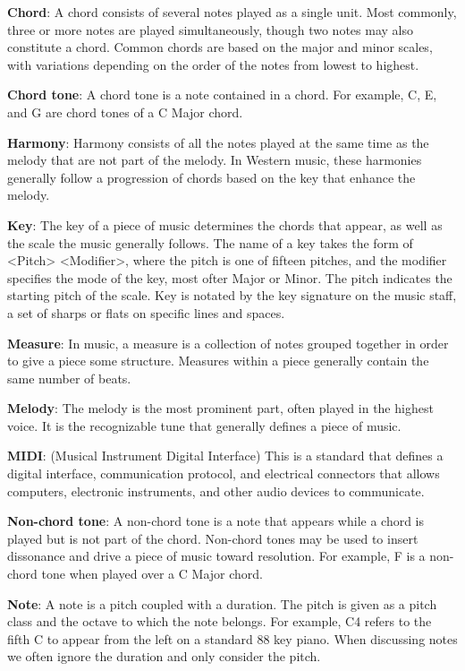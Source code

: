 \textbf{Chord}: A chord consists of several notes played as a single unit.
Most commonly, three or more notes are played simultaneously, though two notes may also constitute a chord.
Common chords are based on the major and minor scales, with variations depending on the order of the notes from lowest to highest.

\textbf{Chord tone}: A chord tone is a note contained in a chord.
For example, C, E, and G are chord tones of a C Major chord.

\textbf{Harmony}: Harmony consists of all the notes played at the same time as the melody that are not part of the melody.
In Western music, these harmonies generally follow a progression of chords based on the key that enhance the melody.

\textbf{Key}: The key of a piece of music determines the chords that appear, as well as the scale the music generally follows.
The name of a key takes the form of <Pitch> <Modifier>, where the pitch is one of fifteen pitches, and the modifier specifies the mode of the key, most ofter Major or Minor.
The pitch indicates the starting pitch of the scale.
Key is notated by the key signature on the music staff, a set of sharps or flats on specific lines and spaces.

\textbf{Measure}: In music, a measure is a collection of notes grouped together in order to give a piece some structure.
Measures within a piece generally contain the same number of beats.

\textbf{Melody}: The melody is the most prominent part, often played in the highest voice.
It is the recognizable tune that generally defines a piece of music.

\textbf{MIDI}: (Musical Instrument Digital Interface) This is a standard that defines a digital interface, communication protocol, and electrical connectors that allows computers, electronic instruments, and other audio devices to communicate.

\textbf{Non-chord tone}: A non-chord tone is a note that appears while a chord is played but is not part of the chord.
Non-chord tones may be used to insert dissonance and drive a piece of music toward resolution.
For example, F is a non-chord tone when played over a C Major chord.

\textbf{Note}: A note is a pitch coupled with a duration.
The pitch is given as a pitch class and the octave to which the note belongs.
For example, C4 refers to the fifth C to appear from the left on a standard $88$ key piano.
When discussing notes we often ignore the duration and only consider the pitch.

